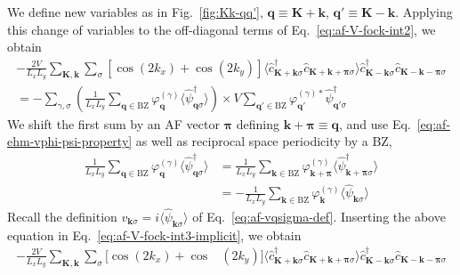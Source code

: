 \begin{tabproof}

	We define new variables as in Fig.~\ref{fig:Kk-qq'}, $\mathbf{q}\equiv\mathbf{K}+\mathbf{k}$, $\mathbf{q}'\equiv\mathbf{K}-\mathbf{k}$.
	Applying this change of variables to the off-diagonal terms of Eq.~\eqref{eq:af-V-fock-int2}, we obtain
	\begin{multline}
		-\frac{2V}{L_x L_y} \sum_{\mathbf{K}, \mathbf{k}} \sum_\sigma [
		\cos \left(
		2k_x
		\right)	+ \cos \left(
		2k_y
		\right)	
		] \langle
		\hat c_{\mathbf{K}+\mathbf{k} \sigma}^\dagger 
		\hat c_{\mathbf{K}+\mathbf{k}+\bm{\pi} \sigma}
		\rangle
		\hat c_{\mathbf{K}-\mathbf{k} \sigma}^\dagger \hat c_{\mathbf{K}-\mathbf{k}-\bm{\pi} \sigma} \\
		= -\sum_{\gamma,\sigma} \left(
		\frac{1}{L_x L_y} \sum_{\mathbf{q}\in\mathrm{BZ}} \varphi_\mathbf{q}^{(\gamma)}
		\langle
		\hat \psi_{\mathbf{q}\sigma}^\dagger
		\rangle
		\right) \times V
		\sum_{\mathbf{q}'\in\mathrm{BZ}}
		\varphi_{\mathbf{q}'}^{(\gamma)*}
		\hat \psi_{\mathbf{q}'\sigma}^\dagger \label{eq:af-V-fock-int3-implicit}
	\end{multline}
	We shift the first sum by an AF vector $\bm{\pi}$ defining $\mathbf{k}+\bm{\pi}\equiv\mathbf{q}$, and use Eq.~\eqref{eq:af-ehm-vphi-psi-property} as well as reciprocal space periodicity by a BZ,
	\[
	\begin{aligned}
		\frac{1}{L_x L_y} \sum_{\mathbf{q}\in\mathrm{BZ}} \varphi_\mathbf{q}^{(\gamma)}
		\langle
		\hat \psi_{\mathbf{q}\sigma}^\dagger
		\rangle &= \frac{1}{L_x L_y} \sum_{\mathbf{k}\in\mathrm{BZ}} \varphi_{\mathbf{k}+\bm{\pi}}^{(\gamma)}
		\langle
		\hat \psi_{\mathbf{k}+\bm{\pi}\sigma}^\dagger
		\rangle \\
		&= - \frac{1}{L_x L_y} \sum_{\mathbf{k}\in\mathrm{BZ}} \varphi_\mathbf{k}^{(\gamma)}
		\langle
		\hat \psi_{\mathbf{k}\sigma}
		\rangle
	\end{aligned}
	\]
	Recall the definition $v_{\mathbf{k}\sigma} = i\langle \hat \psi_{\mathbf{k}\sigma} \rangle$ of Eq.~\eqref{eq:af-vqsigma-def}. Inserting the above equation in Eq.~\eqref{eq:af-V-fock-int3-implicit}, we obtain
	\begin{align}
		-\frac{2V}{L_x L_y} \sum_{\mathbf{K}, \mathbf{k}} \sum_\sigma [
		\cos \left(
		2k_x
		\right)	+ \cos &\left(
		2k_y
		\right)	
		] \langle
		\hat c_{\mathbf{K}+\mathbf{k} \sigma}^\dagger 
		\hat c_{\mathbf{K}+\mathbf{k}+\bm{\pi} \sigma}
		\rangle
		\hat c_{\mathbf{K}-\mathbf{k} \sigma}^\dagger \hat c_{\mathbf{K}-\mathbf{k}-\bm{\pi} \sigma} \nonumber \\

\end{align}
\end{tabproof}
